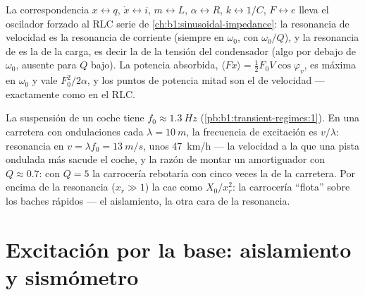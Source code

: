 \begin{remark}\label{rem:b1:oscillators-resonance:analogy}
La correspondencia $x \leftrightarrow q$, $\dot x \leftrightarrow i$,
$m \leftrightarrow L$, $\alpha \leftrightarrow R$, $k \leftrightarrow 1/C$,
$F \leftrightarrow e$ lleva el oscilador forzado al RLC serie de
\cref{ch:b1:sinusoidal-impedance}: la resonancia de velocidad es la
resonancia de corriente (siempre en $\omega_0$, con 
$\omega_0/Q$), y la resonancia de  es la de la carga, es decir la
de la tensión del condensador (algo por debajo de $\omega_0$, ausente para
$Q$ bajo). La potencia absorbida, $\langle F\dot x\rangle
= \tfrac12 F_0V\cos\varphi_v$, es máxima en $\omega_0$ y vale $F_0^2/2\alpha$,
y los puntos de potencia mitad son el  de velocidad ---
exactamente como en el RLC.
\end{remark}

\begin{example}\label{ex:b1:oscillators-resonance:road}
La suspensión de un coche tiene $f_0 \approx \qty{1.3}{Hz}$ (\cref{pb:b1:transient-regimes:1}).
En una carretera con ondulaciones cada $\lambda = \qty{10}{m}$, la
frecuencia de excitación es $v/\lambda$: resonancia en
$v = \lambda f_0 = \qty{13}{m/s}$, unos \qty{47}{km/h} --- la velocidad a
la que una pista ondulada más sacude el coche, y la razón de montar un
amortiguador con $Q \approx 0.7$: con $Q = 5$ la carrocería rebotaría con
cinco veces la  de la carretera. Por encima de la resonancia
($x_r \gg 1$) la  cae como $X_0/x_r^2$: la carrocería ``flota''
sobre los baches rápidos --- el aislamiento, la otra cara de la resonancia.
\end{example}

\section{Excitación por la base: aislamiento y sismómetro}

